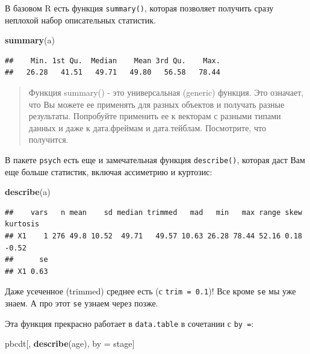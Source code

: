 \documentclass[]{book}
\newenvironment{Shaded}{\begin{snugshade}}{\end{snugshade}}
\newcommand{\KeywordTok}[1]{\textcolor[rgb]{0.13,0.29,0.53}{\textbf{#1}}}
\newcommand{\StringTok}[1]{\textcolor[rgb]{0.31,0.60,0.02}{#1}}
\newcommand{\NormalTok}[1]{#1}
\begin{document}
В базовом R есть функция \texttt{summary()}, которая позволяет получить
сразу неплохой набор описательных статистик.

\begin{Shaded}
\begin{Highlighting}[]
\KeywordTok{summary}\NormalTok{(a)}
\end{Highlighting}
\end{Shaded}

\begin{verbatim}
##    Min. 1st Qu.  Median    Mean 3rd Qu.    Max. 
##   26.28   41.51   49.71   49.80   56.58   78.44
\end{verbatim}

\begin{quote}
Функция summary() - это универсальная (generic) функция. Это означает,
что Вы можете ее применять для разных объектов и получать разные
результаты. Попробуйте применить ее к векторам с разными типами данных и
даже к дата.фреймам и дата.тейблам. Посмотрите, что получится.
\end{quote}

В пакете \texttt{psych} есть еще и замечательная функция
\texttt{describe()}, которая даст Вам еще больше статистик, включая
ассиметрию и куртозис:

\begin{Shaded}
\begin{Highlighting}[]
\KeywordTok{describe}\NormalTok{(a)}
\end{Highlighting}
\end{Shaded}

\begin{verbatim}
##    vars   n mean    sd median trimmed   mad   min   max range skew kurtosis
## X1    1 276 49.8 10.52  49.71   49.57 10.63 26.28 78.44 52.16 0.18    -0.52
##      se
## X1 0.63
\end{verbatim}

Даже усеченное (trimmed) среднее есть (с \texttt{trim\ =\ 0.1})! Все
кроме \texttt{se} мы уже знаем. А про этот \texttt{se} узнаем через
позже.

Эта функция прекрасно работает в \texttt{data.table} в сочетании с
\texttt{by\ =}:

\begin{Shaded}
\begin{Highlighting}[]
\NormalTok{pbcdt[, }\KeywordTok{describe}\NormalTok{(age), by =}\StringTok{ }\NormalTok{stage]}
\end{Highlighting}
\end{Shaded}
\end{document}
